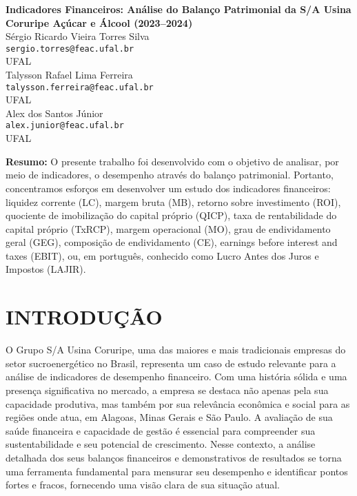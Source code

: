 \documentclass[1pt,a4paper]{article}
\begin{document}
	
	\begin{center}
		\LARGE \textbf{Indicadores Financeiros: Análise do Balanço Patrimonial da S/A Usina Coruripe Açúcar e Álcool (2023–2024)  
		 } \\[1cm]
		
		\large
		Sérgio Ricardo Vieira Torres Silva\\
		\texttt{sergio.torres@feac.ufal.br}\\
		UFAL\\[0.5cm]
		
		Talysson Rafael Lima Ferreira\\
		\texttt{talysson.ferreira@feac.ufal.br}\\
		UFAL\\[0.5cm]
		
		Alex dos Santos Júnior\\
		\texttt{alex.junior@feac.ufal.br}\\
		UFAL\\[0.5cm]
		
		
	\end{center}
	
	\vspace{1cm}
	
	\noindent \textbf{Resumo:} O presente trabalho foi desenvolvido com o objetivo de analisar, por meio de indicadores, o desempenho através do balanço patrimonial. Portanto, concentramos esforços em desenvolver um estudo dos indicadores financeiros: liquidez corrente (LC), margem bruta (MB), retorno sobre investimento (ROI), quociente de imobilização do capital próprio (QICP), taxa de rentabilidade do capital próprio (TxRCP), margem operacional (MO), grau de endividamento geral (GEG), composição de endividamento (CE), earnings before interest and taxes (EBIT), ou, em português, conhecido como Lucro Antes dos Juros e Impostos (LAJIR).
	
	\section{INTRODUÇÃO}
	\setlength{\parindent}{1.5cm}
	
	\hspace*{1.5cm} O Grupo S/A Usina Coruripe, uma das maiores e mais tradicionais empresas do setor sucroenergético no Brasil, representa um caso de estudo relevante para a análise de indicadores de desempenho financeiro. Com uma história sólida e uma presença significativa no mercado, a empresa se destaca não apenas pela sua capacidade produtiva, mas também por sua relevância econômica e social para as regiões onde atua, em Alagoas, Minas Gerais e São Paulo. A avaliação de sua saúde financeira e capacidade de gestão é essencial para compreender sua sustentabilidade e seu potencial de crescimento. Nesse contexto, a análise detalhada dos seus balanços financeiros e demonstrativos de resultados se torna uma ferramenta fundamental para mensurar seu desempenho e identificar pontos fortes e fracos, fornecendo uma visão clara de sua situação atual.
	
\end{document}

